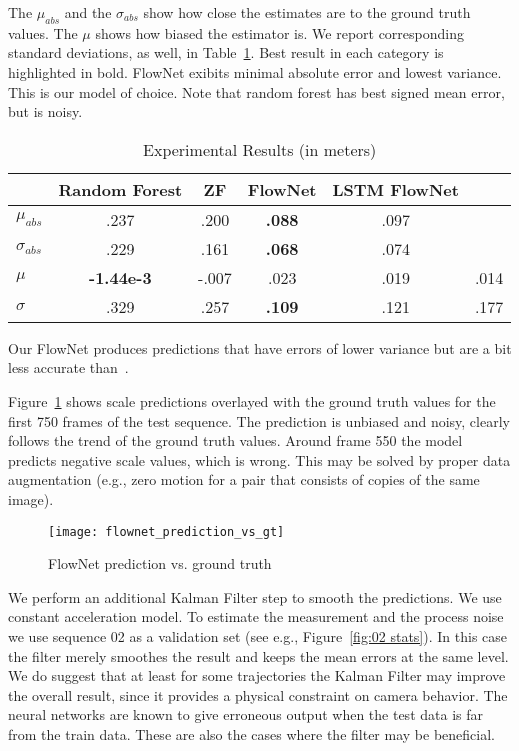 The $\mu_{abs}$ and the $\sigma_{abs}$ show how close the estimates
are to the ground truth values.  The $\mu$ shows how biased the
estimator is.  We report corresponding standard deviations, as well,
in Table~\ref{table:main result}.  Best result in each category is
highlighted in bold.  FlowNet exibits minimal absolute error and
lowest variance.  This is our model of choice.  Note that random
forest has best signed mean error, but is noisy.

\begin{table}[ht]
  \centering
  \begin{tabular}{ lccccc }
    \hline
                       & Random Forest & ZF   & FlowNet          & LSTM FlowNet & \cite{frost2016}   \\
    \hline
    $\mu_{abs}$        & .237          & .200 & \textbf{.088}    & .097  & \\
    $\sigma_{abs}$     & .229          & .161 & \textbf{.068}    & .074  & \\
    $\mu$              & \textbf{-1.44e-3}    & -.007 & .023    & .019  & .014\\
    $\sigma$           & .329          & .257 & \textbf{.109}    & .121  & .177\\
    \hline
  \end{tabular}
  \caption{Experimental Results (in meters)}
  \label{table:main result}
\end{table}

Our FlowNet produces predictions that have errors of lower variance
but are a bit less accurate than~\cite{frost2017using}.

Figure~\ref{fig:pred_vs_gt} shows scale predictions overlayed with the
ground truth values for the first 750 frames of the test sequence.
The prediction is unbiased and noisy, clearly follows the trend of the
ground truth values.  Around frame 550 the model predicts negative
scale values, which is wrong.  This may be solved by proper data
augmentation (e.g., zero motion for a pair that consists of copies of
the same image).

\begin{figure}[!ht]
  \centering
  \texttt{[image: flownet\_prediction\_vs\_gt]}
  \caption{FlowNet prediction vs. ground truth}
  \label{fig:pred_vs_gt}
\end{figure}

We perform an additional Kalman Filter step to smooth the predictions.
We use constant acceleration model.  To estimate the measurement and
the process noise we use sequence 02 as a validation set (see e.g.,
Figure~\ref{fig:02 stats}).  In this case the filter merely smoothes
the result and keeps the mean errors at the same level.  We do suggest
that at least for some trajectories the Kalman Filter may improve the
overall result, since it provides a physical constraint on camera
behavior.  The neural networks are known to give erroneous output when
the test data is far from the train data.  These are also the cases
where the filter may be beneficial.

